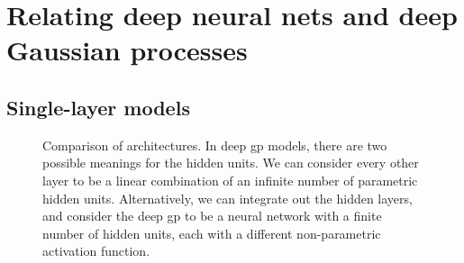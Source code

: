 \documentclass[twoside]{article}
\makeatletter
\newlength{\nonHumbleHeight}
\def\@humbleformat#1{{\settoheight{\nonHumbleHeight}{#1}\resizebox{!}{0.94\nonHumbleHeight}{#1}}}%
\newcommand\humble[1]{{\@humbleformat{#1}}}%
\newcommand{\gp}{{\humble{GP}}}
\newcommand{\gpt}{{\sc gp}}
\newcommand{\sectiondist}{}
\makeatother
\begin{document}







\section{Relating deep neural nets and deep Gaussian processes}
\label{sec:relating}
\sectiondist


\subsection{Single-layer models}

\begin{figure}

\caption{Comparison of architectures.
In deep \gpt{} models, there are two possible meanings for the hidden units.  
We can consider every other layer to be a linear combination of an infinite number of parametric hidden units. Alternatively, we can integrate out the hidden layers, and consider the deep \gpt{} to be a neural network with a finite number of hidden units, each with a different non-parametric activation function.}
\label{fig:architectures}
\end{figure}
\end{document}
